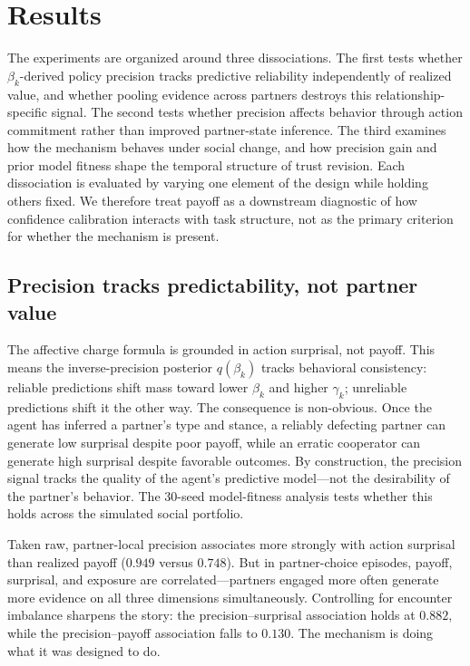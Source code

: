 \section{Results}
\label{sec:results}

The experiments are organized around three dissociations. The first tests whether $\beta_k$-derived policy precision tracks predictive reliability independently of realized value, and whether pooling evidence across partners destroys this relationship-specific signal. The second tests whether precision affects behavior through action commitment rather than improved partner-state inference. The third examines how the mechanism behaves under social change, and how precision gain and prior model fitness shape the temporal structure of trust revision. Each dissociation is evaluated by varying one element of the design while holding others fixed. We therefore treat payoff as a downstream diagnostic of how confidence calibration interacts with task structure, not as the primary criterion for whether the mechanism is present.

\subsection{Precision tracks predictability, not partner value}
\label{sec:model_fitness}

The affective charge formula is grounded in action surprisal, not payoff. This means the inverse-precision posterior $q(\beta_k)$ tracks behavioral consistency: reliable predictions shift mass toward lower $\beta_k$ and higher $\gamma_k$; unreliable predictions shift it the other way. The consequence is non-obvious. Once the agent has inferred a partner's type and stance, a reliably defecting partner can generate low surprisal despite poor payoff, while an erratic cooperator can generate high surprisal despite favorable outcomes. By construction, the precision signal tracks the quality of the agent's predictive model---not the desirability of the partner's behavior. The 30-seed model-fitness analysis tests whether this holds across the simulated social portfolio.

Taken raw, partner-local precision associates more strongly with action surprisal than realized payoff ($0.949$ versus $0.748$). But in partner-choice episodes, payoff, surprisal, and exposure are correlated---partners engaged more often generate more evidence on all three dimensions simultaneously. Controlling for encounter imbalance sharpens the story: the precision--surprisal association holds at $0.882$, while the precision--payoff association falls to $0.130$. The mechanism is doing what it was designed to do.

